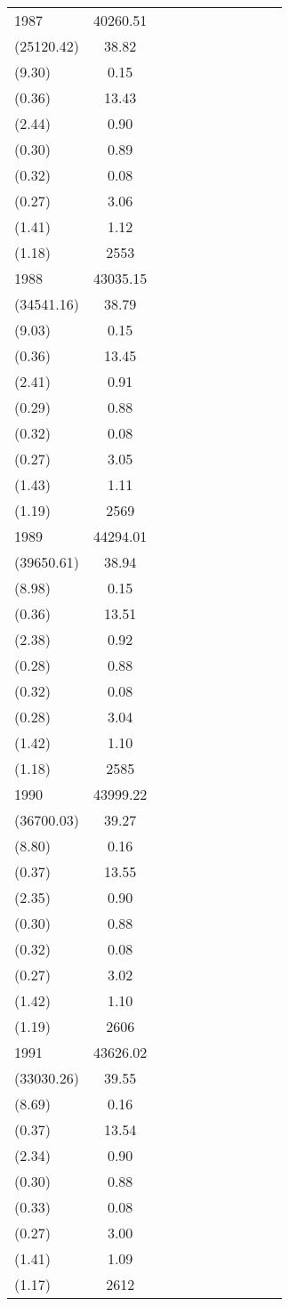 \begin{table}[htbp]
\begin{tabular}{l*{9}{c}c}
1987 & 40260.51\\(25120.42) & 38.82\\(9.30) & 0.15\\(0.36) & 13.43\\(2.44) & 0.90\\(0.30) & 0.89\\(0.32) & 0.08\\(0.27) & 3.06\\(1.41) & 1.12\\(1.18) & 2553 \\
1988 & 43035.15\\(34541.16) & 38.79\\(9.03) & 0.15\\(0.36) & 13.45\\(2.41) & 0.91\\(0.29) & 0.88\\(0.32) & 0.08\\(0.27) & 3.05\\(1.43) & 1.11\\(1.19) & 2569 \\
1989 & 44294.01\\(39650.61) & 38.94\\(8.98) & 0.15\\(0.36) & 13.51\\(2.38) & 0.92\\(0.28) & 0.88\\(0.32) & 0.08\\(0.28) & 3.04\\(1.42) & 1.10\\(1.18) & 2585 \\
1990 & 43999.22\\(36700.03) & 39.27\\(8.80) & 0.16\\(0.37) & 13.55\\(2.35) & 0.90\\(0.30) & 0.88\\(0.32) & 0.08\\(0.27) & 3.02\\(1.42) & 1.10\\(1.19) & 2606 \\
1991 & 43626.02\\(33030.26) & 39.55\\(8.69) & 0.16\\(0.37) & 13.54\\(2.34) & 0.90\\(0.30) & 0.88\\(0.33) & 0.08\\(0.27) & 3.00\\(1.41) & 1.09\\(1.17) & 2612 \\

\end{tabular}
\end{table}
